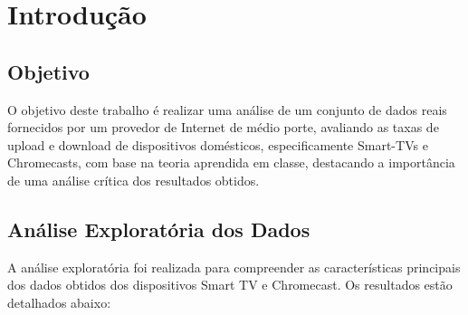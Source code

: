 \section{Introdução}

\subsection{Objetivo}

O objetivo deste trabalho é realizar uma análise de um conjunto de dados reais fornecidos por um provedor de Internet de médio porte, avaliando as taxas de upload e download de dispositivos domésticos, especificamente Smart-TVs e Chromecasts, com base na teoria aprendida em classe, destacando a importância de uma análise crítica dos resultados obtidos.

\subsection{Análise Exploratória dos Dados}

A análise exploratória foi realizada para compreender as características principais dos dados obtidos dos dispositivos Smart TV e Chromecast. Os resultados estão detalhados abaixo:

